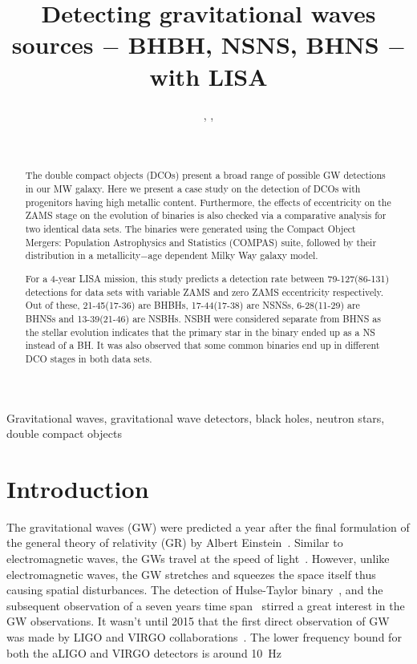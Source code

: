 \documentclass[journal, twocolumn]{IEEEtran}
\title{Detecting gravitational waves sources $-$ BHBH, NSNS, BHNS $-$ with LISA}
\author{
    \IEEEauthorblockN{Nazeela Aimen},
    \IEEEauthorblockN{Syed Ali Mohsin Bukhari},
    \IEEEauthorblockN{Asad Ali}
    \and\\
    \IEEEauthorblockA{
        \textit{
            Department of Applied Mathematics and Statistics, Institute of Space Technology, Islamabad 44000, Pakistan.
        }\\
    }
    \IEEEauthorblockA{
        \textit{
            Space and Astrophysics Research Lab (SARL), Institute of Space Technology, Islamabad 44000, Pakistan.
        }
    }
}
\begin{document}
    \maketitle
    \IEEEpeerreviewmaketitle
    \begin{abstract}
        The double compact objects (DCOs) present a broad range of possible GW detections in our MW galaxy. Here we present a case study on the detection of DCOs with progenitors having high metallic content. Furthermore, the effects of eccentricity on the ZAMS stage on the evolution of binaries is also checked via a comparative analysis for two identical data sets. The binaries were generated using the Compact Object Mergers: Population Astrophysics and Statistics (COMPAS) suite, followed by their distribution in a metallicity$-$age dependent Milky Way galaxy model.
        
        For a 4-year LISA mission, this study predicts a detection rate between 79-127(86-131) detections for data sets with variable ZAMS and zero ZAMS eccentricity respectively. Out of these, 21-45(17-36) are BHBHs, 17-44(17-38) are NSNSs, 6-28(11-29) are BHNSs and 13-39(21-46) are NSBHs.
        NSBH were considered separate from BHNS as the stellar evolution indicates that the primary star in the binary ended up as a NS instead of a BH.
        It was also observed that some common binaries end up in different DCO stages in both data sets.
	\end{abstract}
    \begin{IEEEkeywords}
        Gravitational waves, gravitational wave detectors, black holes, neutron stars, double compact objects
    \end{IEEEkeywords}



    \section{Introduction}
    \label{sec:intro}
    The gravitational waves (GW) were predicted a year after the final formulation of the general theory of relativity (GR) by Albert Einstein~\cite{Einstein1916}.
    Similar to electromagnetic waves, the GWs travel at the speed of light~\citep{Eddington1922, Abott2017}.
    However, unlike electromagnetic waves, the GW stretches and squeezes the space itself thus causing spatial disturbances.
    The detection of Hulse-Taylor binary~\citep{Hulse1975}, and the subsequent observation of a seven years time
    span~\citep{Taylor1982} stirred a great interest in the GW observations.
    It wasn't until 2015 that the first direct observation of GW was made by LIGO and VIRGO collaborations~\citep{Abott2017}.
    The lower frequency bound for both the aLIGO and VIRGO detectors is around \SI{10}{\hertz}~\cite{aLIGO2015, aVIRGO2014}
\end{document}
